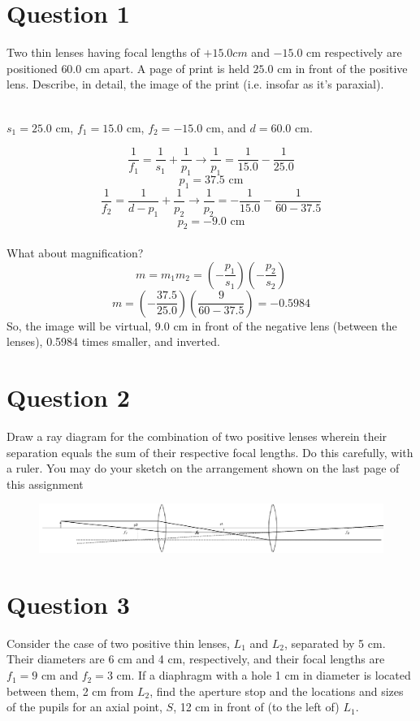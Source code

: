 \documentclass[a4paper]{article}
\begin{document}
\section*{Question 1}
Two thin lenses having focal lengths of $+15.0 cm$ and $-15.0$ cm respectively are positioned $60.0$ cm
apart. A page of print is held $25.0$ cm in front of the positive lens. Describe, in detail, the image of the
print (i.e. insofar as it’s paraxial). \\\\

\begin{center}
    $s_1 = 25.0$ cm, $f_1 = 15.0$ cm, $f_2 = -15.0$ cm, and $d = 60.0$ cm.
\end{center}
$$ \frac{1}{f_1} = \frac{1}{s_1} + \frac{1}{p_1} \rightarrow  \frac{1}{p_1} = \frac{1}{15.0} - \frac{1}{25.0}$$
$$ p_1 = 37.5 \textrm{ cm}$$
$$ \frac{1}{f_2} = \frac{1}{d - p_1} + \frac{1}{p_2} \rightarrow  \frac{1}{p_2} = -\frac{1}{15.0} - \frac{1}{60 - 37.5}$$
$$ p_2 = -9.0 \textrm{ cm}$$\\
What about magnification?
$$ m = m_1 m_2 = \left( - \frac{p_1}{s_1}\right) \left( - \frac{p_2}{s_2}\right)$$
$$ m = \left(-\frac{37.5}{25.0}\right) \left(\frac{9}{60-37.5}\right) = -0.5984$$
So, the image will be virtual, 9.0 cm in front of the negative lens (between the lenses), 0.5984 times smaller, and inverted.

\newpage
\section*{Question 2}
Draw a ray diagram for the combination of two positive lenses wherein their separation equals the
sum of their respective focal lengths. Do this carefully, with a ruler. You may do your sketch on the
arrangement shown on the last page of this assignment

\begin{figure}[htb!]
    \centering
    \includegraphics[angle=90]{hw2q2.pdf}
\end{figure}

\section*{Question 3}
Consider the case of two positive thin lenses, $L_1$ and $L_2$, separated by 5 cm. Their diameters are
6 cm and 4 cm, respectively, and their focal lengths are $f_1 = 9$ cm and $f_2 = 3$ cm. If a diaphragm with a
hole 1 cm in diameter is located between them, 2 cm from $L_2$, find the aperture stop and the locations
and sizes of the pupils for an axial point, $S$, 12 cm in front of (to the left of) $L_1$.\\\\
\end{document}

